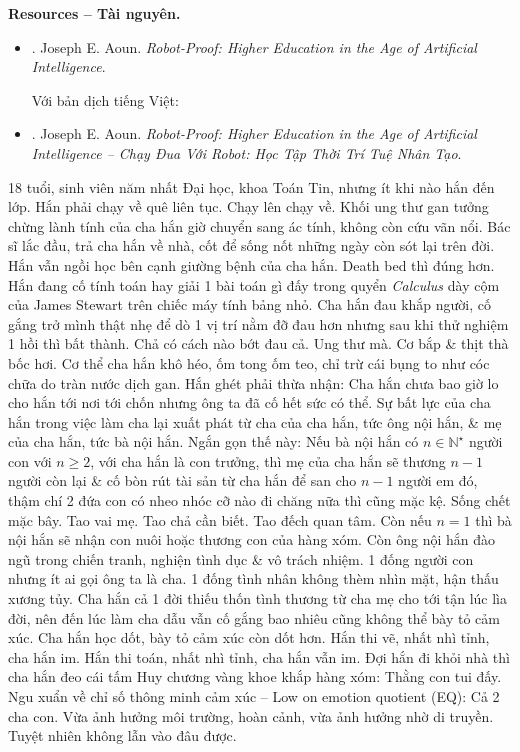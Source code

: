 \documentclass[12pt]{article}
\begin{document}
\noindent\textbf{\textsf{Resources -- Tài nguyên.}}
\begin{itemize}
	\item \cite{Aoun_robot-proof}. {\sc Joseph E. Aoun}. {\it Robot-Proof: Higher Education in the Age of Artificial Intelligence}.
	
	Với bản dịch tiếng Việt:
	\item \cite{Aoun_robot-proof_VN}. {\sc Joseph E. Aoun}. {\it Robot-Proof: Higher Education in the Age of Artificial Intelligence -- Chạy Đua Với Robot: Học Tập Thời Trí Tuệ Nhân Tạo}.
\end{itemize}
18 tuổi, sinh viên năm nhất Đại học, khoa Toán Tin, nhưng ít khi nào hắn đến lớp. Hắn phải chạy về quê liên tục. Chạy lên chạy về. Khối ung thư gan tưởng chừng lành tính của cha hắn giờ chuyển sang ác tính, không còn cứu vãn nổi. Bác sĩ lắc đầu, trả cha hắn về nhà, cốt để sống nốt những ngày còn sót lại trên đời. Hắn vẫn ngồi học bên cạnh giường bệnh của cha hắn. Death bed thì đúng hơn. Hắn đang cố tính toán hay giải 1 bài toán gì đấy trong quyển {\it Calculus} dày cộm của {\sc James Stewart} trên chiếc máy tính bảng nhỏ. Cha hắn đau khắp người, cố gắng trở mình thật nhẹ để dò 1 vị trí nằm đỡ đau hơn nhưng sau khi thử nghiệm 1 hồi thì bất thành. Chả có cách nào bớt đau cả. Ung thư mà. Cơ bắp \& thịt thà bốc hơi. Cơ thể cha hắn khô héo, ốm tong ốm teo, chỉ trừ cái bụng to như cóc chữa do tràn nước dịch gan. Hắn ghét phải thừa nhận: Cha hắn chưa bao giờ lo cho hắn tới nơi tới chốn nhưng ông ta đã cố hết sức có thể. Sự bất lực của cha hắn trong việc làm cha lại xuất phát từ cha của cha hắn, tức ông nội hắn, \& mẹ của cha hắn, tức bà nội hắn. Ngắn gọn thế này: Nếu bà nội hắn có $n\in\mathbb{N}^\star$ người con với $n\ge2$, với cha hắn là con trưởng, thì mẹ của cha hắn sẽ thương $n - 1$ người còn lại \& cố bòn rút tài sản từ cha hắn để san cho $n - 1$ người em đó, thậm chí 2 đứa con có nheo nhóc cỡ nào đi chăng nữa thì cũng mặc kệ. Sống chết mặc bây. Tao vai mẹ. Tao chả cần biết. Tao đếch quan tâm. Còn nếu $n = 1$ thì bà nội hắn sẽ nhận con nuôi hoặc thương con của hàng xóm. Còn ông nội hắn đào ngũ trong chiến tranh, nghiện tình dục \& vô trách nhiệm. 1 đống người con nhưng ít ai gọi ông ta là cha. 1 đống tình nhân không thèm nhìn mặt, hận thấu xương tủy. Cha hắn cả 1 đời thiếu thốn tình thương từ cha mẹ cho tới tận lúc lìa đời, nên đến lúc làm cha dẫu vẫn cố gắng bao nhiêu cũng không thể bày tỏ cảm xúc. Cha hắn học dốt, bày tỏ cảm xúc còn dốt hơn. Hắn thi vẽ, nhất nhì tỉnh, cha hắn im. Hắn thi toán, nhất nhì tỉnh, cha hắn vẫn im. Đợi hắn đi khỏi nhà thì cha hắn đeo cái tấm Huy chương vàng khoe khắp hàng xóm: Thằng con tui đấy. Ngu xuẩn về chỉ số thông minh cảm xúc -- Low on emotion quotient (EQ): Cả 2 cha con. Vừa ảnh hưởng môi trường, hoàn cảnh, vừa ảnh hưởng nhờ di truyền. Tuyệt nhiên không lẫn vào đâu được.
\end{document}
